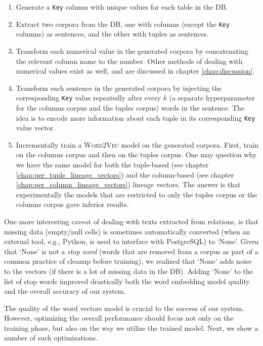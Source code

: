 \begin{enumerate}
    \item Generate a \texttt{Key} column with unique values for each table in the DB.
    \item Extract two corpora from the DB, one with columns (except the \texttt{Key} columns) as sentences, and the other with tuples as sentences.
    \item Transform each numerical value in the generated corpora by concatenating the relevant column name to the number. Other methods of dealing with numerical values exist as well, and are discussed in chapter \ref{chap:discussion}.
    \item Transform each sentence in the generated corpora by injecting the corresponding \texttt{Key} value repeatedly after every $k$ (a separate hyperparameter for the columns corpus and the tuples corpus) words in the sentence. The idea is to encode more information about each tuple in its corresponding \texttt{Key} value vector.
    \item Incrementally train a \textsc{Word2Vec} model on the generated corpora. First, train on the columns corpus and then on the tuples corpus. One may question why we have the same model for both the tuple-based (see chapter \ref{chap:per_tuple_lineage_vectors}) and the column-based (see chapter \ref{chap:per_column_lineage_vectors}) lineage vectors. The answer is that experimentally the models that are restricted to only the tuples corpus or the columns corpus gave inferior results.
\end{enumerate}
One more interesting caveat of dealing with texts extracted from relations, is that missing data (empty/null cells) is sometimes automatically converted (when an external tool, e.g., Python, is used to interface with PostgreSQL) to `None'. Given that `None' is not a \textit{stop word} (words that are removed from a corpus as part of a common practice of cleanup before training), we realized that `None' adds noise to the vectors (if there is a lot of missing data in the DB). Adding `None' to the list of stop words improved drastically both the word embedding model quality and the overall accuracy of our system. \\

\par The quality of the word vectors model is crucial to the success of our system. However, optimizing the overall performance should focus not only on the training phase, but also on the way we utilize the trained model. Next, we show a number of such optimizations.\\
